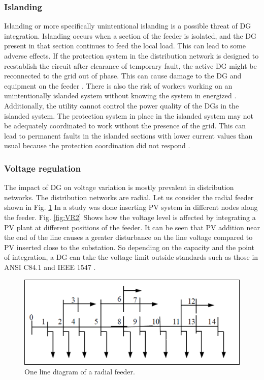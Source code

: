 \subsubsection{Islanding}
Islanding or more specifically unintentional islanding is a possible threat of DG integration. Islanding occurs when a section of the feeder is isolated, and the DG present in that section continues to feed the local load. This can lead to some adverse effects. If the protection system in the distribution network is designed to reestablish the circuit after clearance of temporary fault, the active DG might be reconnected to the grid out of phase. This can cause damage to the DG and equipment on the feeder \cite{ILAND_1}. There is also the risk of workers working on an unintentionally islanded system without knowing the system in energized \cite{ILAND_1}. Additionally, the utility cannot control the power quality of the DGs in the islanded system. The protection system in place in the islanded system may not be adequately coordinated to work without the presence of the grid. This can lead to permanent faults in the islanded sections with lower current values than usual because the protection coordination did not respond \cite{ILAND_2}.

\subsubsection{Voltage regulation}
The impact of DG on voltage variation is mostly prevalent in distribution networks. The distribution networks are radial. Let us consider the radial feeder shown in 
Fig. \ref{fig:VR1} In \cite{VR1} a study was done inserting PV system in different nodes along the feeder. Fig. \ref{fig:VR2} Shows how the voltage level is affected by integrating a PV plant at different positions of the feeder. It can be seen that PV addition near the end of the line causes a greater disturbance on the line voltage compared to PV inserted close to the substation. So depending on the capacity and the point of integration, a DG can take the voltage limit outside standards such as those in ANSI C84.1 and IEEE 1547 \cite{VR2}. 

\begin{figure}[!h]
\centering
\includegraphics[width=0.85\linewidth]{figs/VR1.png}
\caption[One line diagram of a radial feeder]{One line diagram of a radial feeder.\cite{VR1}}
\label{fig:VR1}
\end{figure}

